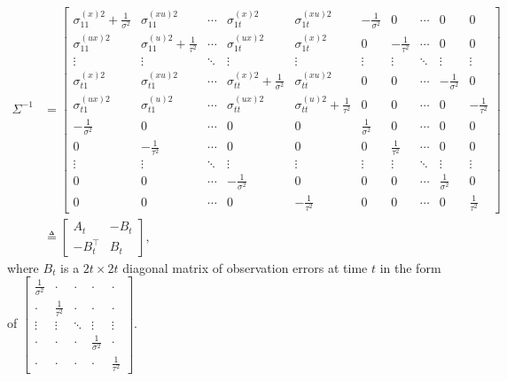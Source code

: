 \begin{align} \Sigma^{-1} &=
\begin{bmatrix}
\sigma_{11}^{(x)2}+\frac{1}{\sigma^2} & \sigma_{11}^{(xu)2} & \cdots & \sigma_{1t}^{(x)2} & \sigma_{1t}^{(xu)2}  &  -\frac{1}{\sigma^2} & 0 & \cdots & 0 & 0\\
\sigma_{11}^{(ux)2}   & \sigma_{11}^{(u)2} +\frac{1}{\tau^2} & \cdots & \sigma_{1t}^{(ux)2} & \sigma_{1t}^{(x)2}  &  0 & -\frac{1}{\tau^2} & \cdots & 0 & 0 \\
\vdots & \vdots & \ddots & \vdots & \vdots & \vdots & \vdots &\ddots & \vdots & \vdots \\
\sigma_{t1}^{(x)2}   & \sigma_{t1}^{(xu)2} & \cdots & \sigma_{tt}^{(x)2} +\frac{1}{\sigma^2}  & \sigma_{tt}^{(xu)2}  &  0 & 0 & \cdots & -\frac{1}{\sigma^2} & 0 \\
\sigma_{t1}^{(ux)2}   & \sigma_{t1}^{(u)2} & \cdots & \sigma_{tt}^{(ux)2} & \sigma_{tt}^{(u)2} +\frac{1}{\tau^2}  &  0 & 0 & \cdots & 0 &-\frac{1}{\tau^2} \\
- \frac{1}{\sigma^2} & 0 & \cdots & 0 & 0 &  \frac{1}{\sigma^2} & 0 & \cdots & 0 & 0\\
0  & -\frac{1}{\tau^2}& \cdots & 0 & 0 &  0 &  \frac{1}{\tau^2} & \cdots & 0 & 0 \\
\vdots & \vdots & \ddots & \vdots & \vdots & \vdots & \vdots &\ddots & \vdots & \vdots \\
0 & 0& \cdots & -\frac{1}{\sigma^2}  &0&  0 & 0 & \cdots & \frac{1}{\sigma^2} & 0 \\
0 & 0 & \cdots & 0 & -\frac{1}{\tau^2}   &  0 & 0 & \cdots & 0 & \frac{1}{\tau^2}
\end{bmatrix} \\ 
& \triangleq \begin{bmatrix}
A_t& -B_t \\ -B_t^\top & B_t
\end{bmatrix},
\end{align}
where $B_t$ is a $2t\times 2t$ diagonal matrix of observation errors at time $t$ in the form of $\begin{bmatrix}
\frac{1}{\sigma^2}& \cdot & \cdot &  \cdot  &  \cdot \\  \cdot & \frac{1}{\tau^2} & \cdot &  \cdot  &  \cdot  \\ 
\vdots & \vdots & \ddots & \vdots & \vdots \\
 \cdot  &  \cdot  & \cdot  & \frac{1}{\sigma^2}&  \cdot \\  \cdot  &  \cdot & \cdot  &  \cdot  & \frac{1}{\tau^2}
\end{bmatrix}$. 
